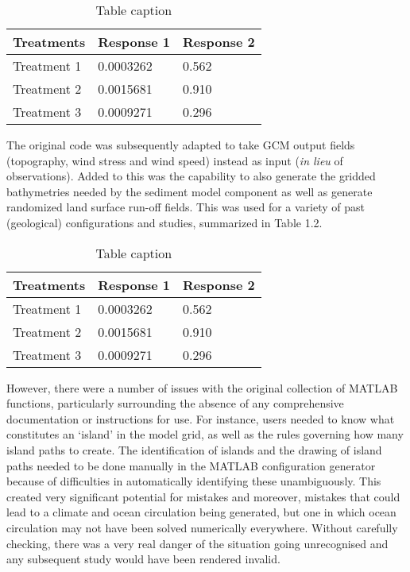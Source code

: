 \documentclass[11pt,fleqn]{book} %
\begin{document}
\begin{table}[h]
\centering
\begin{tabular}{l l l}
\toprule
\textbf{Treatments} & \textbf{Response 1} & \textbf{Response 2}\\
\midrule
Treatment 1 & 0.0003262 & 0.562 \\
Treatment 2 & 0.0015681 & 0.910 \\
Treatment 3 & 0.0009271 & 0.296 \\
\bottomrule
\end{tabular}
\caption{Table caption}
\end{table}

The original code was subsequently adapted to take GCM output fields (topography, wind stress and wind speed) instead as input (\textit{in lieu} of observations). Added to this was the capability to also generate the gridded bathymetries needed by the sediment model component as well as generate randomized land surface run-off fields. This was used for a variety of past (geological) configurations and studies, summarized in Table 1.2.

\begin{table}[h]
\centering
\begin{tabular}{l l l}
\toprule
\textbf{Treatments} & \textbf{Response 1} & \textbf{Response 2}\\
\midrule
Treatment 1 & 0.0003262 & 0.562 \\
Treatment 2 & 0.0015681 & 0.910 \\
Treatment 3 & 0.0009271 & 0.296 \\
\bottomrule
\end{tabular}
\caption{Table caption}
\end{table}

However, there were a number of issues with the original collection of MATLAB functions, particularly surrounding the absence of any comprehensive documentation or instructions for use. For instance, users needed to know what constitutes an `island' in the model grid, as well as the rules governing how many island paths to create. The identification of islands and the drawing of island paths needed to be done manually in the MATLAB configuration generator because of difficulties in automatically identifying these unambiguously. This created very significant potential for mistakes and moreover, mistakes that could lead to a climate and ocean circulation being generated, but one in which ocean circulation may not have been solved numerically everywhere. Without carefully checking, there was a very real danger of the situation going unrecognised and any subsequent study would have been rendered invalid.
\end{document}
